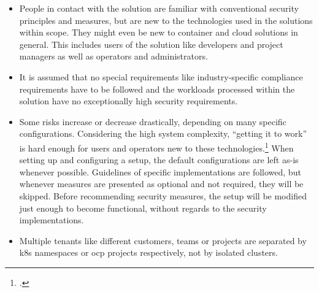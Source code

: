 \begin{itemize}

\item People in contact with the solution are familiar with conventional security principles and measures, but are new to the technologies used in the solutions within scope. They might even be new to container and cloud solutions in general. This includes users of the solution like developers and project managers as well as operators and administrators.

\item It is assumed that no special requirements like industry-specific compliance requirements have to be followed and the workloads processed within the solution have no exceptionally high security requirements. 


\item Some risks increase or decrease drastically, depending on many specific configurations. Considering the high system complexity, ``getting it to work'' is hard enough for users and operators new to these technologies.\footcite[][, starting at 3:05]{hackAndHarden} When setting up and configuring a setup, the default configurations are left as-is whenever possible. Guidelines of specific implementations are followed, but whenever measures are presented as optional and not required, they will be skipped. Before recommending security measures, the setup will be modified just enough to become functional, without regards to the security implementations.

\item Multiple tenants like different customers, teams or projects are separated by \gls{k8s} namespaces or \gls{ocp} projects respectively, not by isolated clusters.

\end{itemize}


